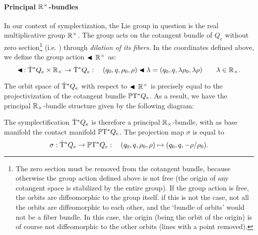 \paragraph{Principal \texorpdfstring{$\mathbb{R}^\times$}{R}-bundles} In our context of symplectization, the Lie group in question is the real multiplicative group $\mathbb{R}^\times$. The group acts on the cotangent bundle of $Q_e$ without zero section\footnote
{
    The zero section must be removed from the cotangent bundle, because otherwise the group action defined above is not free (the origin of any cotangent space is stabilized by the entire group). If the group action is free, the orbits are diffeomorphic to the group itself. if this is not the case, not all the orbits are diffeomorphic to each other, and the `bundle of orbits' would not be a fiber bundle. In this case, the origin (being the orbit of the origin) is of course not diffeomorphic to the other orbits (lines with a point removed).
}
(i.e. ) through \emph{dilation of its fibers}. In the coordinates defined above, we define the group action $\blacktriangleleft\,\mathbb{R}^\times$ as:
$$ \blacktriangleleft\,: \mathrm{\dot{T}}^*Q_e\times\mathbb{R}_{\times} \to \mathrm{\dot{T}}^*Q_e : \quad (q_0, q, \rho_0, \rho) \blacktriangleleft \lambda = (q_0, q, \lambda \rho_0, \lambda \rho ) \qquad \lambda \in \mathbb{R}_{\times}.$$

The orbit space of $\mathrm{\dot{T}}^*Q_e$ with respect to $\blacktriangleleft\,\mathbb{R}^\times$ is precisely equal to the projectivization of the cotangent bundle $\mathbb{P}\mathrm{T}^* Q_e$. As a result, we have the principal $\mathbb{R}_{\times}$-bundle structure given by the following diagram:
\begin{center}
\end{center}

The symplectification $\mathrm{\dot{T}}^*Q_e$ is therefore a principal $\mathbb{R}_{\times}$-bundle, with as base manifold the contact manifold $\mathbb{P}\mathrm{T}^* Q_e$. The projection map $\sigma$ is equal to
$$ \sigma: \mathrm{\dot{T}}^*Q_e \to \mathbb{P}\mathrm{T}^* Q_e: \quad (q_0, q, \rho_0, \rho) \mapsto (q_0, q, -\rho/\rho_0).$$

